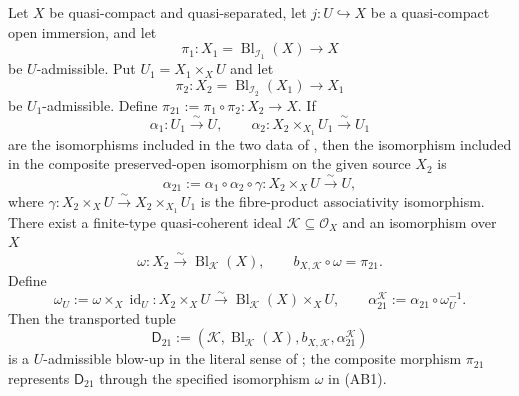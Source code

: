 \begin{lemma}
  \label{lemma:nagata-admissible-blowup-comp}

  Let $X$ be quasi-compact and quasi-separated, let
  $j\colon U\hookrightarrow X$ be a quasi-compact open immersion, and let
  \[
    \pi_1\colon X_1=\operatorname{Bl}_{\mathcal I_1}(X)\to X
  \]
  be $U$-admissible.  Put $U_1=X_1\times_XU$ and let
  \[
    \pi_2\colon X_2=\operatorname{Bl}_{\mathcal I_2}(X_1)\to X_1
  \]
  be $U_1$-admissible.  Define
  $\pi_{21}:=\pi_1\circ\pi_2\colon X_2\to X$.  If
  \[
    \alpha_1\colon U_1\xrightarrow{\sim}U,
    \qquad
    \alpha_2\colon X_2\times_{X_1}U_1\xrightarrow{\sim}U_1
  \]
  are the isomorphisms included in the two data of
  , then the isomorphism included in the
  composite preserved-open isomorphism on the given source $X_2$ is
  \[
    \alpha_{21}:=\alpha_1\circ\alpha_2\circ\gamma
      \colon X_2\times_XU\xrightarrow{\sim}U,
  \]
  where
  $\gamma\colon X_2\times_XU\xrightarrow{\sim}
    X_2\times_{X_1}U_1$ is the fibre-product associativity isomorphism.
  There exist a finite-type quasi-coherent ideal
  $\mathcal K\subseteq\mathcal O_X$ and an isomorphism over $X$
  \[
    \omega\colon X_2\xrightarrow{\sim}\operatorname{Bl}_{\mathcal K}(X),
    \qquad
    b_{X,\mathcal K}\circ\omega=\pi_{21}.                      \tag{AB1}
  \]
  Define
  \[
    \omega_U:=\omega\times_X\operatorname{id}_U
      \colon X_2\times_XU\xrightarrow{\sim}
        \operatorname{Bl}_{\mathcal K}(X)\times_XU,
    \qquad
    \alpha_{21}^{\mathcal K}:=
      \alpha_{21}\circ\omega_U^{-1}.                          \tag{AB2}
  \]
  Then the transported tuple
  \[
    \mathsf D_{21}:=
      (\mathcal K,\operatorname{Bl}_{\mathcal K}(X),
        b_{X,\mathcal K},\alpha_{21}^{\mathcal K})             \tag{AB3}
  \]
  is a $U$-admissible blow-up in the literal sense of
  ; the composite morphism
  $\pi_{21}$ represents $\mathsf D_{21}$ through the specified isomorphism
  $\omega$ in (AB1).
\end{lemma}

